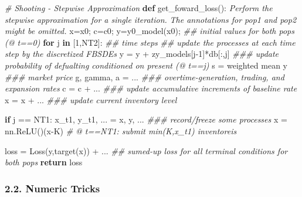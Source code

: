 \documentclass[
]{article}
\newenvironment{Shaded}{}{}
\newcommand{\CommentTok}[1]{\textcolor[rgb]{0.38,0.63,0.69}{\textit{#1}}}
\newcommand{\ControlFlowTok}[1]{\textcolor[rgb]{0.00,0.44,0.13}{\textbf{#1}}}
\newcommand{\DecValTok}[1]{\textcolor[rgb]{0.25,0.63,0.44}{#1}}
\newcommand{\KeywordTok}[1]{\textcolor[rgb]{0.00,0.44,0.13}{\textbf{#1}}}
\newcommand{\NormalTok}[1]{#1}
\newcommand{\OperatorTok}[1]{\textcolor[rgb]{0.40,0.40,0.40}{#1}}
\begin{document}
\begin{Shaded}
\begin{Highlighting}[]
\CommentTok{\# Shooting {-} Stepwise Approximation}
\KeywordTok{def}\NormalTok{ get\_foward\_loss():}
    \CommentTok{\textquotesingle{}\textquotesingle{}\textquotesingle{}}
\CommentTok{    Perform the stepwise approximation for a single iteration. }
\CommentTok{    The annotations for pop1 and pop2 might be omitted.}
\CommentTok{    \textquotesingle{}\textquotesingle{}\textquotesingle{}}
\NormalTok{    x}\OperatorTok{=}\NormalTok{x0}\OperatorTok{;}\NormalTok{ c}\OperatorTok{=}\NormalTok{c0}\OperatorTok{;}\NormalTok{ y}\OperatorTok{=}\NormalTok{y0\_model(x0)}\OperatorTok{;} \CommentTok{\#\# initial values for both pops (@ t==0)}
    \ControlFlowTok{for}\NormalTok{ j }\KeywordTok{in}\NormalTok{ [}\DecValTok{1}\NormalTok{,NT2]:  }\CommentTok{\#\# time steps}
        \CommentTok{\#\# update the processes at each time step by the discretized FBSDEs}
\NormalTok{        y }\OperatorTok{=}\NormalTok{ y }\OperatorTok{+}\NormalTok{ zy\_models[j}\OperatorTok{{-}}\DecValTok{1}\NormalTok{]}\OperatorTok{*}\NormalTok{db[:,j] }\CommentTok{\#\#\# update probability of defualting conditioned on present (@ t==j)}
\NormalTok{        s }\OperatorTok{=}\NormalTok{ weighted mean y  }\CommentTok{\#\#\# market price}
\NormalTok{        g, gamma, a }\OperatorTok{=}\NormalTok{ ... }\CommentTok{\#\#\# overtime{-}generation, trading, and expansion rates }
\NormalTok{        c }\OperatorTok{=}\NormalTok{ c }\OperatorTok{+}\NormalTok{ ...  }\CommentTok{\#\#\# update accumulative increments of baseline rate}
\NormalTok{        x }\OperatorTok{=}\NormalTok{ x }\OperatorTok{+}\NormalTok{ ...  }\CommentTok{\#\#\# update current inventory level}

        \ControlFlowTok{if}\NormalTok{ j }\OperatorTok{==}\NormalTok{ NT1:}
\NormalTok{            x\_t1, y\_t1, ... }\OperatorTok{=}\NormalTok{ x, y, ... }\CommentTok{\#\#\# record/freeze some processes }
\NormalTok{            x }\OperatorTok{=}\NormalTok{ nn.ReLU()(x}\OperatorTok{{-}}\NormalTok{K)  }\CommentTok{\# @ t==NT1: submit min(K,x\_t1) inventoreis}

\NormalTok{    loss }\OperatorTok{=}\NormalTok{ Loss(y,target(x)) }\OperatorTok{+}\NormalTok{ ...  }\CommentTok{\#\# sumed{-}up loss for all terminal conditions for both pops}
    \ControlFlowTok{return}\NormalTok{ loss }
\end{Highlighting}
\end{Shaded}

\hypertarget{numeric-tricks}{%
\subsubsection{2.2. Numeric Tricks}\label{numeric-tricks}}
\end{document}
